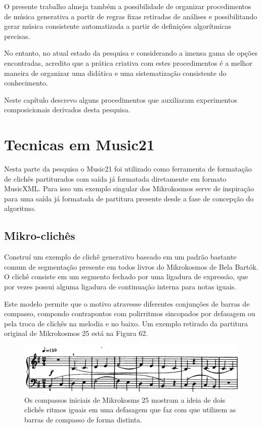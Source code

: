 \documentclass[
	12pt,				%
	openright,			%
	twoside,			%
	a4paper,			%
	english,			%
	french,				%
	spanish,			%
	brazil				%
	]{abntex2}
\begin{document}
O presente trabalho almeja também a possibilidade de organizar procedimentos de música generativa a partir de regras fixas retiradas de análises e possibilitando gerar música consistente automatizada a partir de definições algorítmicas precisas. 

No entanto, no atual estado da pesquisa e considerando a imensa gama de opções encontradas, acredito que a prática criativa com estes procedimentos é a melhor maneira de organizar uma didática e uma sistematização consistente do conhecimento. 

Neste capítulo descrevo alguns procedimentos que auxiliaram experimentos composicionais derivados desta pesquisa. 

\section{Tecnicas em Music21}

Nesta parte da pesquisa o Music21 foi utilizado como ferramenta de formatação de clichês partiturados com saída já formatada diretamente em formato MusicXML. Para isso um exemplo singular dos Mikrokosmos serve de inspiração para uma saída já formatada de partitura presente desde a fase de concepção do algoritmo.

\subsection{Mikro-clichês}
\label{mikrocliches}

Construí um exemplo de clichê generativo baseado em um padrão bastante comum de segmentação presente em todos livros do Mikrokosmos de Bela Bartók. O clichê consiste em um segmento fechado por uma ligadura de expressão, que por vezes possui alguma ligadura de continuação interna para notas iguais. 

Este modelo permite que o motivo atravesse diferentes conjunções de barras de compasso, compondo contrapontos com polirritmos sincopados por defasagem ou pela troca de clichês na melodia e no baixo. Um exemplo retirado da partitura original de Mikrokosmos 25 está na Figura 62.

\begin{figure}[!h]
	\caption{\label{fig_grafico}Os compassos iniciais de Mikrokosms 25 mostram a ideia de dois clichês ritmos iguais em uma defasagem que faz com que utilizem as barras de compasso de forma distinta. }
	\begin{center}
	    \includegraphics[scale=0.35]{score/mikro25.png}
	\end{center}
\end{figure}
\end{document}
